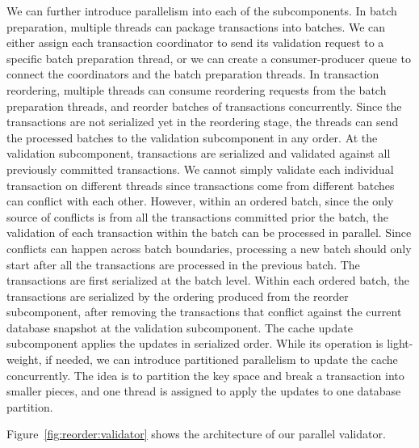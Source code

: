 We can further introduce parallelism into each of the subcomponents. In batch preparation, multiple threads can package transactions into batches. We can either assign each transaction coordinator to send its validation request to a specific batch preparation thread, or we can create a consumer-producer queue to connect the coordinators and the batch preparation threads. In transaction reordering, multiple threads can consume reordering requests from the batch preparation threads, and reorder batches of transactions concurrently. Since the transactions are not serialized yet in the reordering stage, the threads can send the processed batches to the validation subcomponent in any order. At the validation subcomponent, transactions are serialized and validated against all previously committed transactions. We cannot simply validate each individual transaction on different threads since transactions come from different batches can conflict with each other. However, within an ordered batch, since the only source of conflicts is from all the transactions committed prior the batch, the validation of each transaction within the batch can be processed in parallel. Since conflicts can happen across batch boundaries, processing a new batch should only start after all the transactions are processed in the previous batch. The transactions are first serialized at the batch level. Within each ordered batch, the transactions are serialized by the ordering produced from the reorder subcomponent, after removing the transactions that conflict against the current database snapshot at the validation subcomponent. The cache update subcomponent applies the updates in serialized order. While its operation is light-weight, if needed, we can introduce partitioned parallelism to update the cache concurrently. The idea is to partition the key space and break a transaction into smaller pieces, and one thread is assigned to apply the updates to one database partition. 

Figure~\ref{fig:reorder:validator} shows the architecture of our parallel validator. 


